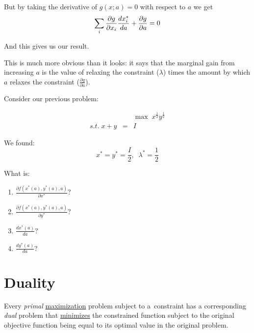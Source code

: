 \documentclass[11pt,english]{article}
\begin{document}
\bigskip But by taking the derivative of $g(x;a)=0$ with respect to $a$ we
get 
\begin{equation*}
\sum_{i}\frac{\partial g}{\partial x_{i}}\frac{dx_{i}^{\ast }}{da}+\frac{%
\partial g}{\partial a}=0
\end{equation*}

\bigskip And this gives us our result.

This is much more obvious than it looks: it says that the marginal gain from
increasing $a$ is the value of relaxing the constraint ($\lambda $) times
the amount by which $a$ relaxes the constraint ($\frac{\partial g}{\partial a%
}$).

\bigskip

Consider our previous problem:

\begin{eqnarray*}
&&\max \;x^{\frac{1}{2}}y^{\frac{1}{2}} \\
s.t.\;x+y &=&I
\end{eqnarray*}

We found: 
\begin{equation*}
x^{\ast }=y^{\ast }=\frac{I}{2},\;\;\lambda ^{\ast }=\frac{1}{2}
\end{equation*}

What is:

\begin{enumerate}
\item $\frac{\partial f(x^{\ast }(a),y^{\ast }(a),a)}{\partial x^{\ast }}?$

\item $\frac{\partial f(x^{\ast }(a),y^{\ast }(a),a)}{\partial y^{\ast }}?$

\item $\frac{dx^{\ast }(a)}{da}?$

\item $\frac{dy^{\ast }(a)}{da}?$
\end{enumerate}

\bigskip

\section{Duality}

\bigskip

Every \textit{primal} \underline{maximization} problem subject to a\
constraint has a corresponding \textit{dual} problem that \underline{%
minimizes} the constrained function subject to the original objective
function being equal to its optimal value in the original problem.
\end{document}
